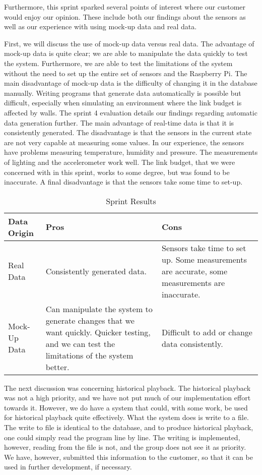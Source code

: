 \documentclass[../document]{subfiles}
\begin{document}
Furthermore, this sprint sparked several points of interest where our customer would enjoy our opinion. These include both our findings about the sensors as well as our experience with using mock-up data and real data.

First, we will discuss the use of mock-up data versus real data. The advantage of mock-up data is quite clear; we are able to manipulate the data quickly to test the system. Furthermore, we are able to test the limitations of the system without the need to set up the entire set of sensors and the Raspberry Pi. The main disadvantage of mock-up data is the difficulty of changing it in the database manually. Writing programs that generate data automatically is possible but difficult, especially when simulating an environment where the link budget is affected by walls. The sprint 4 evaluation details our findings regarding automatic data generation further. The main advantage of real-time data is that it is consistently generated. The disadvantage is that the sensors in the current state are not very capable at measuring some values. In our experience, the sensors have problems measuring temperature, humidity and pressure. The measurements of lighting and the accelerometer work well. The link budget, that we were concerned with in this sprint, works to some degree, but was found to be inaccurate. A final disadvantage is that the sensors take some time to set-up.

\begin{table}[H]
\caption{Sprint Results}
\centering
\begin{tabularx}{\textwidth}{|l|X|X|}
\hline
Data Origin
&Pros
&Cons
\\ \hline Real Data
&Consistently generated data.
&Sensors take time to set up. Some measurements are accurate, some measurements are inaccurate.
\\ \hline Mock-Up Data
&Can manipulate the system to generate changes that we want quickly. Quicker testing, and we can test the limitations of the system better.
&Difficult to add or change data consistently.
\\ \hline 
\end{tabularx}
\end{table}	

The next discussion was concerning historical playback. The historical playback was not a high priority, and we have not put much of our implementation effort towards it. However, we do have a system that could, with some work, be used for historical playback quite effectively. What the system does is write to a file. The write to file is identical to the database, and to produce historical playback, one could simply read the program line by line. The writing is implemented, however, reading from the file is not, and the group does not see it as priority. We have, however, submitted this information to the customer, so that it can be used in further development, if necessary.
\end{document}
